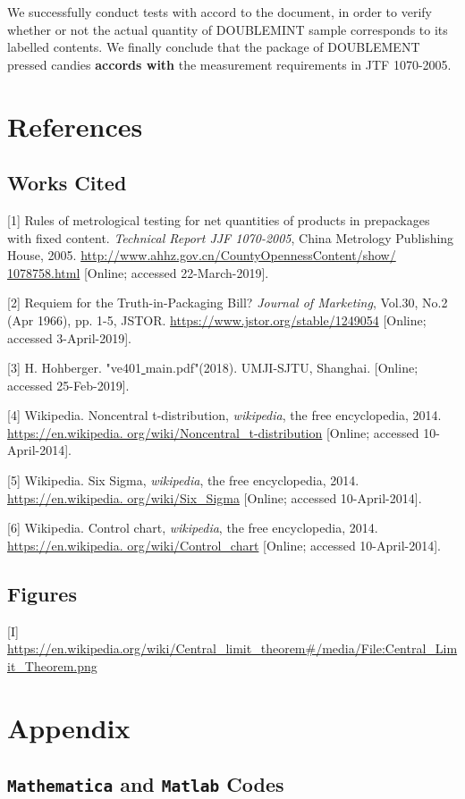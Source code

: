 \documentclass[a4paper]{article}
\begin{document}
We successfully conduct tests with accord to the document, in order to verify whether or not the actual quantity of DOUBLEMINT sample corresponds to its labelled contents. We finally conclude that the package of DOUBLEMENT pressed candies \textbf{accords with} the measurement requirements in JTF 1070-2005. 

\newpage

\section{References}
\subsection{Works Cited}

[1] Rules of metrological testing for net quantities of products in prepackages with fixed content. \textit{Technical Report JJF 1070-2005}, China Metrology Publishing House, 2005. \url{http://www.ahhz.gov.cn/CountyOpennessContent/show/ 1078758.html} [Online; accessed 22-March-2019].

[2] Requiem for the Truth-in-Packaging Bill? \textit{Journal of Marketing}, Vol.30, No.2 (Apr 1966), pp. 1-5, JSTOR. \url{https://www.jstor.org/stable/1249054} [Online; accessed 3-April-2019].

[3] H. Hohberger. "ve401\uline{ }main.pdf"(2018). UMJI-SJTU, Shanghai. [Online; accessed 25-Feb-2019]. 

[4] Wikipedia. Noncentral t-distribution, \textit{wikipedia}, the free encyclopedia, 2014. \url{https://en.wikipedia. org/wiki/Noncentral_t-distribution} [Online; accessed 10-April-2014]. 

[5] Wikipedia. Six Sigma, \textit{wikipedia}, the free encyclopedia, 2014. \url{https://en.wikipedia. org/wiki/Six_Sigma} [Online; accessed 10-April-2014]. 

[6] Wikipedia. Control chart, \textit{wikipedia}, the free encyclopedia, 2014. \url{https://en.wikipedia. org/wiki/Control_chart} [Online; accessed 10-April-2014]. 
\subsection{Figures}
[I] \url{https://en.wikipedia.org/wiki/Central_limit_theorem#/media/File:Central_Limit_Theorem.png}

\section{Appendix}
\subsection{\texttt{Mathematica} and \texttt{Matlab} Codes}
\end{document}
